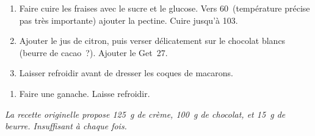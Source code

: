 \begin{recipe}
  \begin{enumerate}

  \item Faire cuire les fraises avec le sucre et le glucose.  Vers
    60\C\ (temp\'erature pr\'ecise pas tr\`es importante) ajouter la
    pectine.  Cuire jusqu'\`a 103\C.

  \item Ajouter le jus de citron, puis verser d\'elicatement sur le
    chocolat blancs (beurre de cacao~?).  Ajouter le Get~27.

  \item Laisser refroidir avant de dresser les coques de macarons.
  \end{enumerate}  
\end{recipe}



\begin{ingredients}
\end{ingredients}


\begin{recipe}
  \begin{enumerate}

  \item Faire une ganache.  Laisse  refroidir.

  \end{enumerate}
\end{recipe}

{\it La recette originelle propose 125~g de crème, 100~g de chocolat,
  et 15~g de beurre.  Insuffisant à chaque fois.}
